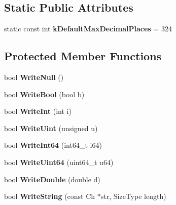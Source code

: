 \subsection*{Static Public Attributes}
\begin{DoxyCompactItemize}
\item 
\mbox{\label{classWriter_aae4a08df2e7529e2faeb81ca16eed1e4}} 
static const int {\bfseries k\+Default\+Max\+Decimal\+Places} = 324
\end{DoxyCompactItemize}
\subsection*{Protected Member Functions}
\begin{DoxyCompactItemize}
\item 
\mbox{\label{classWriter_af4f79d39ad69cbbc7976565dd257b436}} 
bool {\bfseries Write\+Null} ()
\item 
\mbox{\label{classWriter_a21f1adc6a520084ed4f39522ed9f4540}} 
bool {\bfseries Write\+Bool} (bool b)
\item 
\mbox{\label{classWriter_acc42b38b43ae1488fc2e779c8a333d34}} 
bool {\bfseries Write\+Int} (int i)
\item 
\mbox{\label{classWriter_aa7e4196f87bfa66c9619e0efd15d16ea}} 
bool {\bfseries Write\+Uint} (unsigned u)
\item 
\mbox{\label{classWriter_ad68f4e0a85cc944a0740200544c97ed9}} 
bool {\bfseries Write\+Int64} (int64\+\_\+t i64)
\item 
\mbox{\label{classWriter_ac3d17e9409c202e39b0cd887545783d6}} 
bool {\bfseries Write\+Uint64} (uint64\+\_\+t u64)
\item 
\mbox{\label{classWriter_aced9cb2b88abc16c4a0bdb75920cd424}} 
bool {\bfseries Write\+Double} (double d)
\item 
\mbox{\label{classWriter_aab4926d061472149998b89b4d34e1a4b}} 
bool {\bfseries Write\+String} (const Ch $\ast$str, Size\+Type length)
\item 
\mbox{\label{classWriter_ad3578f94664c62e6b0773f4dc0567a17}} 

\end{DoxyCompactItemize}
